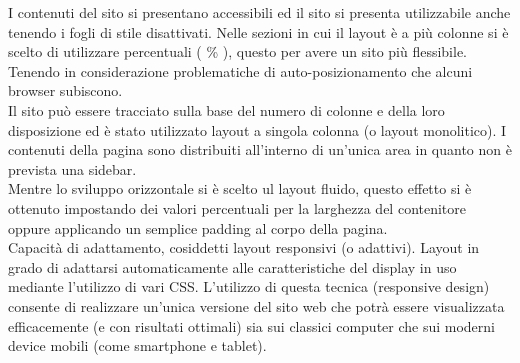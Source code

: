 {	I contenuti del sito si presentano accessibili ed il sito si presenta utilizzabile anche tenendo i fogli di stile disattivati.
	Nelle sezioni in cui il layout è a più colonne si è scelto di utilizzare percentuali ( \% ), questo per avere un sito più flessibile. Tenendo in considerazione problematiche di auto-posizionamento che alcuni browser subiscono.\\
	Il sito può essere tracciato sulla base del numero di colonne e della loro disposizione ed è stato utilizzato layout a singola colonna (o layout monolitico). I contenuti della pagina sono distribuiti all'interno di un'unica area in quanto non è prevista una sidebar.\\
	Mentre lo sviluppo orizzontale si è scelto ul layout fluido, questo effetto si è ottenuto impostando dei valori percentuali per la larghezza del contenitore oppure applicando un semplice padding al corpo della pagina.\\
	Capacità di adattamento, cosiddetti layout responsivi (o adattivi). Layout in grado di adattarsi automaticamente alle caratteristiche del display in uso mediante l'utilizzo di vari CSS. L'utilizzo di questa tecnica (responsive design) consente di realizzare un'unica versione del sito web che potrà essere visualizzata efficacemente (e con risultati ottimali) sia sui classici computer che sui moderni device mobili (come smartphone e tablet).
	
	
	
}
